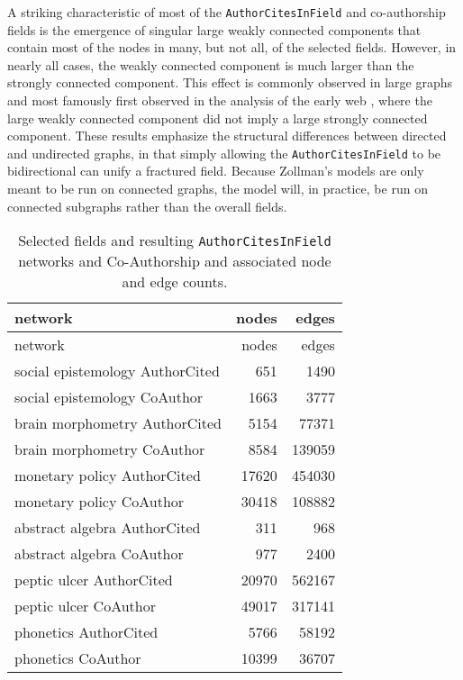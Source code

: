 A striking characteristic of most of the \texttt{AuthorCitesInField} and
co-authorship fields is the emergence of singular large weakly connected
components that contain most of the nodes in many, but not all, of the
selected fields. However, in nearly all cases, the weakly connected
component is much larger than the strongly connected component. This
effect is commonly observed in large graphs and most famously first
observed in the analysis of the early web
\autocite{broderGraphStructureWeb2000b}, where the large weakly
connected component did not imply a large strongly connected component.
These results emphasize the structural differences between directed and
undirected graphs, in that simply allowing the
\texttt{AuthorCitesInField} to be bidirectional can unify a fractured
field. Because Zollman's models are only meant to be run on connected
graphs, the model will, in practice, be run on connected subgraphs
rather than the overall fields.

\begin{longtable}[]{@{}lrr@{}}
\caption{Selected fields and resulting \texttt{AuthorCitesInField}
networks and Co-Authorship and associated node and edge counts.
\label{tbl:networknec}}\tabularnewline
\toprule
network & nodes & edges\tabularnewline
\midrule
\endfirsthead
\toprule
network & nodes & edges\tabularnewline
\midrule
\endhead
social epistemology AuthorCited & 651 & 1490\tabularnewline
social epistemology CoAuthor & 1663 & 3777\tabularnewline
brain morphometry AuthorCited & 5154 & 77371\tabularnewline
brain morphometry CoAuthor & 8584 & 139059\tabularnewline
monetary policy AuthorCited & 17620 & 454030\tabularnewline
monetary policy CoAuthor & 30418 & 108882\tabularnewline
abstract algebra AuthorCited & 311 & 968\tabularnewline
abstract algebra CoAuthor & 977 & 2400\tabularnewline
peptic ulcer AuthorCited & 20970 & 562167\tabularnewline
peptic ulcer CoAuthor & 49017 & 317141\tabularnewline
phonetics AuthorCited & 5766 & 58192\tabularnewline
phonetics CoAuthor & 10399 & 36707\tabularnewline
\bottomrule
\end{longtable}

